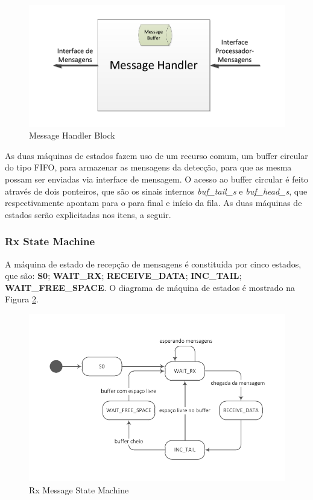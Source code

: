 \documentclass[monografia]{subfiles}
\begin{document}
			\begin{figure}[!h]
			\centering 
			\includegraphics[scale=0.65]{img/modulos/mod_messageHandler.pdf}
			\caption{Message Handler Block}
			\label{fig:messageHandlerBlock}
			\end{figure}		

		As duas máquinas de estados fazem uso de um recurso comum, um buffer circular do tipo FIFO, para armazenar as mensagens da detecção, 
		para que as mesma possam ser enviadas via interface de mensagem. O acesso ao buffer circular é feito através de dois ponteiros, 
		que são os sinais internos \textit{buf\_tail\_s} e \textit{buf\_head\_s}, que respectivamente apontam para o para final e início da fila.
		As duas máquinas de estados serão explicitadas nos itens, a seguir.

		\subsubsection*{Rx State Machine}
		\label{sec:rxStateMachineSection}
			A máquina de estado de recepção de mensagens é constituída por cinco estados, que são: \textbf{S0}; \textbf{WAIT\_RX}; \textbf{RECEIVE\_DATA}; 
			\textbf{INC\_TAIL}; \textbf{WAIT\_FREE\_SPACE}. O diagrama de máquina de estados é mostrado na Figura \ref{fig:rxMessageStatemachine}.

			\begin{figure}[!h]
			\centering
				\includegraphics[scale=1.3]{img/stateMachines/rxMsgState.pdf}
			\caption{Rx Message State Machine}
			\label{fig:rxMessageStatemachine}
			\end{figure}
\end{document}
